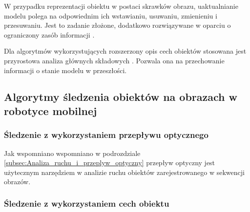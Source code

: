 W przypadku reprezentacji obiektu w postaci skrawków obrazu, uaktualnianie modelu polega na odpowiednim ich wstawianiu, usuwaniu, zmienieniu i przesuwaniu. Jest to zadanie złożone, dodatkowo rozwiązywane w oparciu o ograniczony zasób informacji \cite{Smeulders2010}.

Dla algorytmów wykorzystujących rozszerzony opis cech obiektów stosowana jest przyrostowa analiza głównych składowych \cite{Smeulders2010}. Pozwala ona na przechowanie informacji o stanie modelu w przeszłości. 

\subsection{Algorytmy śledzenia obiektów na obrazach w robotyce mobilnej}
\label{subsec:Algorytmy_sledzenia_obiektow_na_obrazach_w_robotyce_mobilnej}

\subsubsection{Śledzenie z wykorzystaniem przepływu optycznego}
\label{subsubsec:Sledzenie_z_wykorzystaniem_przeplywu_optycznego}

Jak wspomniano wspomniano w podrozdziale \ref{subsec:Analiza_ruchu_i_przeplyw_optyczny} przepływ optyczny jest użytecznym narzędziem w analizie ruchu obiektów zarejestrowanego w sekwencji obrazów. 

\subsubsection{Śledzenie z wykorzystaniem cech obiektu}
\label{subsubsec:Sledzenie_z_wykorzystaniem_cech}